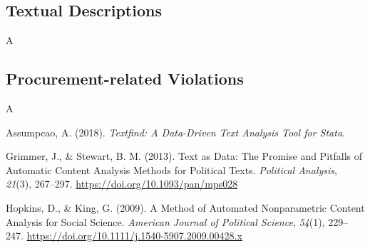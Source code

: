 \documentclass[]{article}
\theoremstyle{definition}
\theoremstyle{definition}
\theoremstyle{definition}
\theoremstyle{remark}
\begin{document}
\hypertarget{quality2}{%
\subsection{Textual Descriptions}\label{quality2}}

A

\hypertarget{quality3}{%
\subsection{Procurement-related Violations}\label{quality3}}

A

\hypertarget{refs}{}
\leavevmode\hypertarget{ref-AssumpcaotextfindDataDrivenText2018}{}%
Assumpcao, A. (2018). \emph{Textfind: A Data-Driven Text Analysis Tool
for Stata}.

\leavevmode\hypertarget{ref-GrimmerTextDataPromise2013a}{}%
Grimmer, J., \& Stewart, B. M. (2013). Text as Data: The Promise and
Pitfalls of Automatic Content Analysis Methods for Political Texts.
\emph{Political Analysis}, \emph{21}(3), 267--297.
\url{https://doi.org/10.1093/pan/mps028}

\leavevmode\hypertarget{ref-HopkinsMethodAutomatedNonparametric2009}{}%
Hopkins, D., \& King, G. (2009). A Method of Automated Nonparametric
Content Analysis for Social Science. \emph{American Journal of Political
Science}, \emph{54}(1), 229--247.
\url{https://doi.org/10.1111/j.1540-5907.2009.00428.x}
\end{document}
